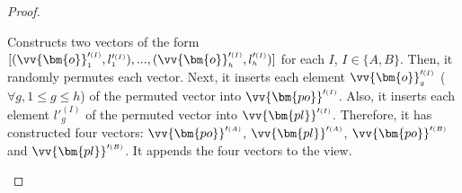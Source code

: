 \begin{proof}
\begin{packed_enum}



\item Constructs two vectors of the form   $[(\vv{\bm{o}}'^{\scriptscriptstyle (I)}_{\scriptscriptstyle 1},l'^{\scriptscriptstyle (I)}_{\scriptscriptstyle 1}),...,(\vv{\bm{o}}'^{\scriptscriptstyle (I)}_{\scriptscriptstyle h},l'^{\scriptscriptstyle (I)}_{\scriptscriptstyle h})]$ for each $I$, $I\in \{A,B\}$. Then, it randomly permutes each vector. Next,  it inserts each element  $\vv{\bm{o}}'^{\scriptscriptstyle (I)}_{\scriptscriptstyle g}$ ($\forall g, 1\leq g\leq h$) of the permuted vector into $\vv{\bm{po}}'^{\scriptscriptstyle (I)}$. Also, it inserts each element $l'^{\scriptscriptstyle (I)}_{\scriptscriptstyle g}$ of the permuted vector into $\vv{\bm{pl}}'^{\scriptscriptstyle (I)}$. Therefore, it has constructed four vectors: $\vv{\bm{po}}'^{\scriptscriptstyle (A)}$, $\vv{\bm{pl}}'^{\scriptscriptstyle (A)}$, $\vv{\bm{po}}'^{\scriptscriptstyle (B)}$ and   $\vv{\bm{pl}}'^{\scriptscriptstyle (B)}$. It appends the four vectors to the view.







\end{packed_enum}
\end{proof}
